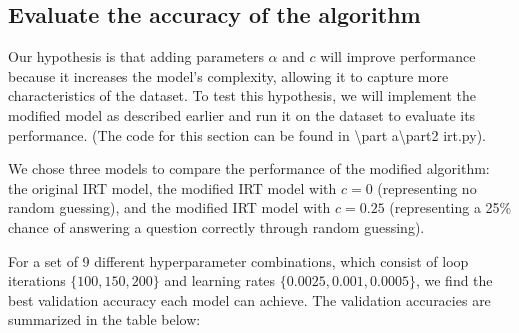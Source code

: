 \documentclass{article}
\begin{document}
\subsection{Evaluate the accuracy of the algorithm}

Our hypothesis is that adding parameters $\alpha$ and $c$ will improve performance because it increases the model's complexity, allowing it to capture more characteristics of the dataset. To test this hypothesis, we will implement the modified model as described earlier and run it on the dataset to evaluate its performance. (The code for this section can be found in \textbackslash part a\textbackslash part2 irt.py).

We chose three models to compare the performance of the modified algorithm: the original IRT model, the modified IRT model with $c = 0$ (representing no random guessing), and the modified IRT model with $c = 0.25$ (representing a 25\% chance of answering a question correctly through random guessing).

For a set of 9 different hyperparameter combinations, which consist of loop iterations $\{100, 150, 200\}$ and learning rates $\{0.0025, 0.001, 0.0005\}$, we find the best validation accuracy each model can achieve. The validation accuracies are summarized in the table below:
\end{document}
